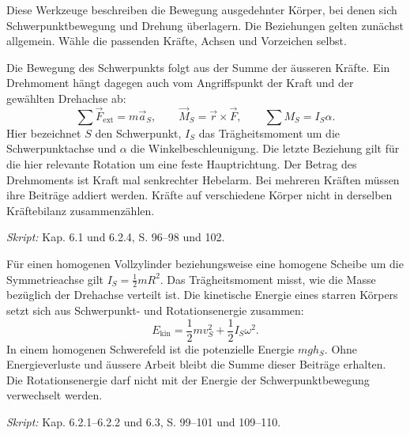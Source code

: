 
Diese Werkzeuge beschreiben die Bewegung ausgedehnter Körper, bei denen sich
Schwerpunktbewegung und Drehung überlagern. Die Beziehungen gelten zunächst
allgemein. Wähle die passenden Kräfte, Achsen und Vorzeichen selbst.

\begin{werkzeugkasten}
Die Bewegung des Schwerpunkts folgt aus der Summe der äusseren Kräfte. Ein
Drehmoment hängt dagegen auch vom Angriffspunkt der Kraft und der gewählten
Drehachse ab:
\begin{equation}
  \sum \vec F_{\mathrm{ext}}=m\vec a_S,
  \qquad
  \vec M_S=\vec r\times\vec F,
  \qquad
  \sum M_S=I_S\alpha.
\end{equation}
Hier bezeichnet $S$ den Schwerpunkt, $I_S$ das Trägheitsmoment um die
Schwerpunktachse und $\alpha$ die Winkelbeschleunigung. Die letzte Beziehung
gilt für die hier relevante Rotation um eine feste Hauptrichtung. Der Betrag des
Drehmoments ist Kraft mal senkrechter Hebelarm. Bei mehreren Kräften müssen
ihre Beiträge addiert werden. Kräfte auf verschiedene Körper nicht in derselben
Kräftebilanz zusammenzählen.

\textit{Skript:} Kap. 6.1 und 6.2.4, S. 96--98 und 102.
\end{werkzeugkasten}

\begin{werkzeugkasten}
Für einen homogenen Vollzylinder beziehungsweise eine homogene Scheibe um die
Symmetrieachse gilt $I_S=\tfrac12 mR^2$. Das Trägheitsmoment misst, wie die
Masse bezüglich der Drehachse verteilt ist. Die kinetische Energie eines starren
Körpers setzt sich aus Schwerpunkt- und Rotationsenergie zusammen:
\begin{equation}
  E_{\mathrm{kin}}=\frac12 mv_S^2+\frac12 I_S\omega^2.
\end{equation}
In einem homogenen Schwerefeld ist die potenzielle Energie $mgh_S$. Ohne
Energieverluste und äussere Arbeit bleibt die Summe dieser Beiträge erhalten.
Die Rotationsenergie darf nicht mit der Energie der Schwerpunktbewegung
verwechselt werden.

\textit{Skript:} Kap. 6.2.1--6.2.2 und 6.3, S. 99--101 und 109--110.
\end{werkzeugkasten}

